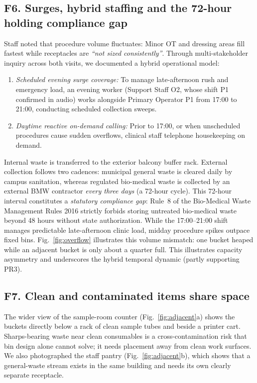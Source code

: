 \documentclass[10pt,twocolumn,a4paper]{article}
\newcommand{\figref}[1]{Fig.~\ref{#1}}
\newcommand{\quoteS}[1]{\textit{``#1''}}
\begin{document}
\subsection{F6. Surges, hybrid staffing and the 72-hour holding compliance gap}
Staff noted that procedure volume fluctuates: Minor OT and dressing areas fill fastest while receptacles are \quoteS{not sized consistently}. Through multi-stakeholder inquiry across both visits, we documented a hybrid operational model:
\begin{enumerate}
\item \emph{Scheduled evening surge coverage:} To manage late-afternoon rush and emergency load, an evening worker (Support Staff O2, whose shift P1 confirmed in audio) works alongside Primary Operator P1 from 17:00 to 21:00, conducting scheduled collection sweeps.
\item \emph{Daytime reactive on-demand calling:} Prior to 17:00, or when unscheduled procedures cause sudden overflows, clinical staff telephone housekeeping on demand.
\end{enumerate}
Internal waste is transferred to the exterior balcony buffer rack. External collection follows two cadences: municipal general waste is cleared daily by campus sanitation, whereas regulated bio-medical waste is collected by an external BMW contractor \emph{every three days} (a 72-hour cycle). This 72-hour interval constitutes a \emph{statutory compliance gap}: Rule~8 of the Bio-Medical Waste Management Rules 2016 \cite{bmw2016} strictly forbids storing untreated bio-medical waste beyond 48 hours without state authorization. While the 17:00--21:00 shift manages predictable late-afternoon clinic load, midday procedure spikes outpace fixed bins. \figref{fig:overflow} illustrates this volume mismatch: one bucket heaped while an adjacent bucket is only about a quarter full. This illustrates capacity asymmetry and underscores the hybrid temporal dynamic (partly supporting PR3).

\subsection{F7. Clean and contaminated items share space}
The wider view of the sample-room counter (\figref{fig:adjacent}a) shows the buckets directly below a rack of clean sample tubes and beside a printer cart. Sharps-bearing waste near clean consumables is a cross-contamination risk that bin design alone cannot solve; it needs placement away from clean work surfaces. We also photographed the staff pantry (\figref{fig:adjacent}b), which shows that a general-waste stream exists in the same building and needs its own clearly separate receptacle.
\end{document}
